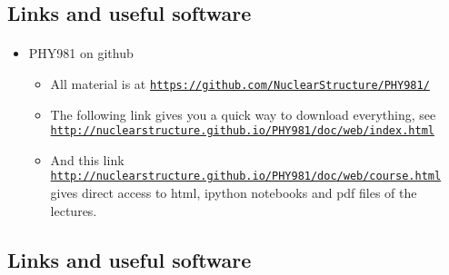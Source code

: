 \documentclass[%
twoside,                 %
final,                   %
10pt]{article}
\begin{document}
\subsection{Links and useful software}

\paragraph{}
\begin{itemize}
\item PHY981 on github
\begin{itemize}

 \item All material is at  \href{{https://github.com/NuclearStructure/PHY981/}}{\nolinkurl{https://github.com/NuclearStructure/PHY981/}}

 \item The following link gives you a quick way to download everything, see \href{{http://nuclearstructure.github.io/PHY981/doc/web/index.html}}{\nolinkurl{http://nuclearstructure.github.io/PHY981/doc/web/index.html}}

 \item And this link \href{{http://nuclearstructure.github.io/PHY981/doc/web/course.html}}{\nolinkurl{http://nuclearstructure.github.io/PHY981/doc/web/course.html}} gives direct access to html, ipython notebooks and pdf files of the lectures.
\end{itemize}

\noindent
\end{itemize}

\noindent




\subsection{Links and useful software}

\end{document}
